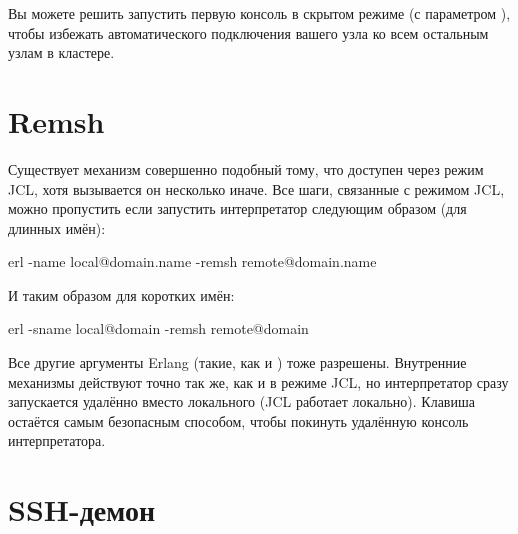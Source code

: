\documentclass[11pt, oneside]{book}   	%
\begin{document}
Вы можете решить запустить первую консоль в скрытом режиме (с параметром ), чтобы избежать автоматического подключения вашего узла ко всем остальным узлам в кластере.


\section{Remsh}

Существует механизм совершенно подобный тому, что доступен через режим JCL, хотя вызывается он несколько иначе. Все шаги, связанные с режимом JCL, можно пропустить если запустить интерпретатор следующим образом (для длинных имён):

\begin{VerbatimText}
erl -name local@domain.name -remsh remote@domain.name
\end{VerbatimText}

И таким образом для коротких имён:

\begin{VerbatimText}
erl -sname local@domain -remsh remote@domain
\end{VerbatimText}

Все другие аргументы Erlang (такие, как  и ) тоже разрешены. Внутренние механизмы действуют точно так же, как и в режиме JCL, но интерпретатор сразу запускается удалённо вместо локального (JCL работает локально). Клавиша  остаётся самым безопасным способом, чтобы покинуть удалённую консоль интерпретатора.


\section{SSH-демон}
\end{document}
